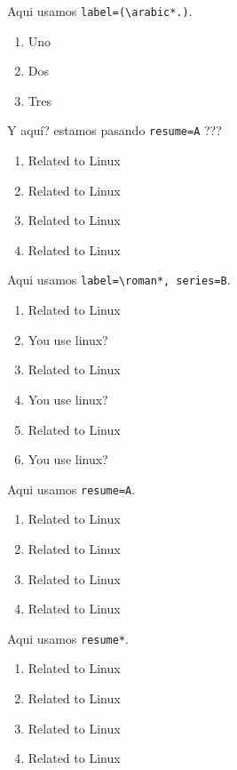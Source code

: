 \documentclass{article}
\begin{document}
Aqui usamos \verb+label=(\arabic*.)+.

\begin{enumerate}[label=(\arabic*.),]
  \item Uno
  \item Dos
  \item Tres
\end{enumerate}

Y aquí? estamos pasando \verb+resume=A+ ???

\begin{enumerate}[resume=A]
  \item Related to Linux
  \item Related to Linux
  \item Related to Linux
  \item Related to Linux
\end{enumerate}

Aqui usamos \verb+label=\roman*, series=B+.

\begin{enumerate}[label=\roman*, series=B]
  \item Related to Linux
  \item You use linux? %
  \item Related to Linux
  \item You use linux? %
  \item Related to Linux
  \item You use linux? %
\end{enumerate}

Aqui usamos \verb+resume=A+.

\begin{enumerate}[resume=A]
  \item Related to Linux
  \item Related to Linux
  \item Related to Linux
  \item Related to Linux
\end{enumerate}

Aqui usamos \verb+resume*+.

\begin{enumerate}[resume]
  \item Related to Linux
  \item Related to Linux
  \item Related to Linux
  \item Related to Linux
\end{enumerate}

\stop
\end{document}
